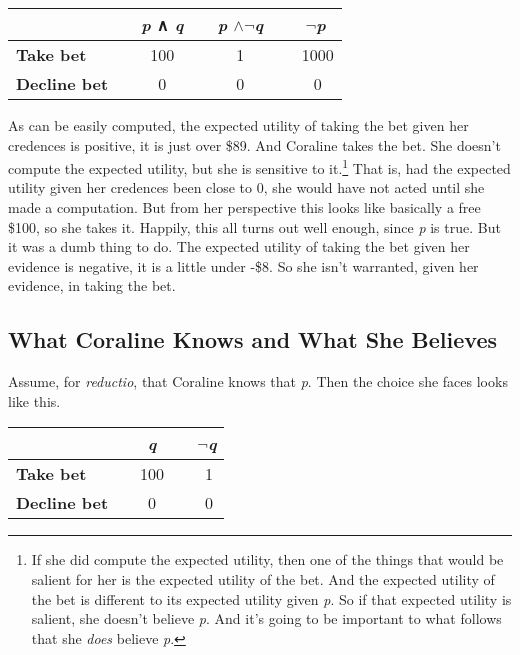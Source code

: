 \documentclass[
  11pt,
  letterpaper,
  DIV=11,
  numbers=noendperiod,
  twoside]{scrartcl}
\begin{document}
\begin{longtable}[]{@{}lccc@{}}
\toprule\noalign{}
~ & ~\emph{p} ∧ \emph{q}~ & ~\emph{p} \(\wedge \neg\)\emph{q}~ &
~\(\neg\)\emph{p} \\
\midrule\noalign{}
\endhead
\bottomrule\noalign{}
\endlastfoot
\textbf{Take bet} ~ & ~ 100 ~ & ~ 1 ~ & ~ 1000 \\
\textbf{Decline bet}~ & ~ 0 ~ & ~ 0 ~ & ~ 0 \\
\end{longtable}

As can be easily computed, the expected utility of taking the bet given
her credences is positive, it is just over \$89. And Coraline takes the
bet. She doesn't compute the expected utility, but she is sensitive to
it.\footnote{If she did compute the expected utility, then one of the
  things that would be salient for her is the expected utility of the
  bet. And the expected utility of the bet is different to its expected
  utility given \emph{p}. So if that expected utility is salient, she
  doesn't believe \emph{p}. And it's going to be important to what
  follows that she \emph{does} believe \emph{p}.} That is, had the
expected utility given her credences been close to 0, she would have not
acted until she made a computation. But from her perspective this looks
like basically a free \$100, so she takes it. Happily, this all turns
out well enough, since \emph{p} is true. But it was a dumb thing to do.
The expected utility of taking the bet given her evidence is negative,
it is a little under -\$8. So she isn't warranted, given her evidence,
in taking the bet.

\subsection{What Coraline Knows and What She
Believes}\label{what-coraline-knows-and-what-she-believes}

Assume, for \emph{reductio}, that Coraline knows that \emph{p}. Then the
choice she faces looks like this.

\begin{longtable}[]{@{}lcc@{}}
\toprule\noalign{}
~ & ~\emph{q}~ & ~\(\neg\)\emph{q} \\
\midrule\noalign{}
\endhead
\bottomrule\noalign{}
\endlastfoot
\textbf{Take bet} ~ & ~100~ & ~ 1 \\
\textbf{Decline bet}~ & ~ 0 ~ & ~ 0 \\
\end{longtable}
\end{document}
